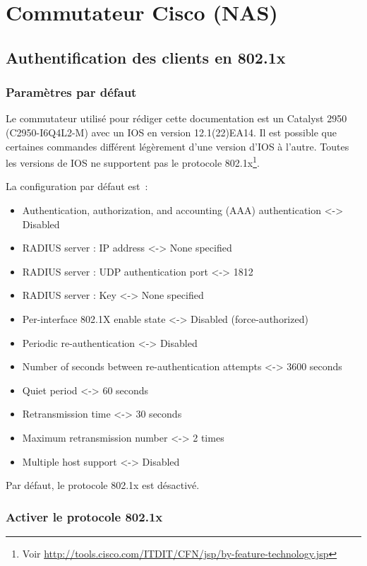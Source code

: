 \section{Commutateur Cisco (NAS)}
\subsection{Authentification des clients en 802.1x}
\subsubsection{Paramètres par défaut}

{\Large\Info} Le commutateur utilisé pour rédiger cette documentation est un Catalyst 2950 (C2950-I6Q4L2-M) avec un IOS en version 12.1(22)EA14. Il est possible que certaines commandes différent légèrement d'une version d'IOS à l'autre. Toutes les versions de IOS ne supportent pas le protocole 802.1x\footnote{Voir \url{http://tools.cisco.com/ITDIT/CFN/jsp/by-feature-technology.jsp}}.

La configuration par défaut est~:

\begin{itemize}
\item Authentication, authorization, and accounting (AAA) authentication <-> Disabled
\item RADIUS server : IP address <-> None specified
\item RADIUS server : UDP authentication port <-> 1812
\item RADIUS server : Key <-> None specified
\item Per-interface 802.1X enable state <-> Disabled (force-authorized)
\item Periodic re-authentication <-> Disabled
\item Number of seconds between re-authentication attempts <-> 3600 seconds
\item Quiet period <-> 60 seconds
\item Retransmission time <-> 30 seconds
\item Maximum retransmission number <-> 2 times
\item Multiple host support <-> Disabled
\end{itemize}

Par défaut, le protocole 802.1x est désactivé.

\subsubsection{Activer le protocole 802.1x}

